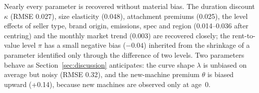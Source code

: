 Nearly every parameter is recovered without material bias. The duration discount $\kappa$
(RMSE 0.027), size elasticity (0.048), attachment premiums (0.025), the level effects of seller
type, brand origin, emissions, spec and region (0.014--0.036 after centring) and the monthly market
trend (0.003) are recovered closely; the rent-to-value level $\pi$ has a small negative bias
($-0.04$) inherited from the shrinkage of a parameter identified only through the difference of two
levels. Two parameters behave as Section~\ref{sec:discussion} anticipates: the curve shape
$\lambda$ is unbiased on average but noisy (RMSE 0.32), and the new-machine premium $\theta$ is
biased upward (+0.14), because new machines are observed only at age~0.
